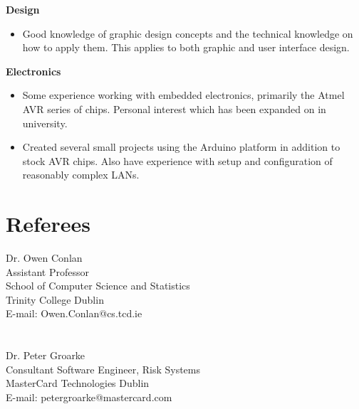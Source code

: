 \documentclass{res}
\begin{document}
\begin{resume}
  {\bf Design} 
        \begin{itemize}
        \item Good knowledge of graphic design concepts and the technical knowledge on how to apply them. This applies to both graphic and user interface design.
       \end{itemize}

   {\bf  Electronics} 
        \begin{itemize}
        \item  Some experience working with embedded electronics, primarily the Atmel AVR series of chips. Personal interest which has been expanded on in university. 
        \item Created several small projects using the Arduino platform in addition to stock AVR chips. Also have experience with setup and configuration of reasonably complex LANs.
       \end{itemize} 

 
\section{Referees}
\vspace{0.1in} 
 
   Dr. Owen Conlan\\
   Assistant Professor\\
   School of Computer Science and Statistics\\
   Trinity College Dublin\\
   E-mail: Owen.Conlan@cs.tcd.ie\\
   \\
   \\
   Dr. Peter Groarke\\
   Consultant Software Engineer, Risk Systems\\
   MasterCard Technologies Dublin\\
   E-mail: peter\textunderscore groarke@mastercard.com\\
  



    
 

\end{resume}
\end{document}
